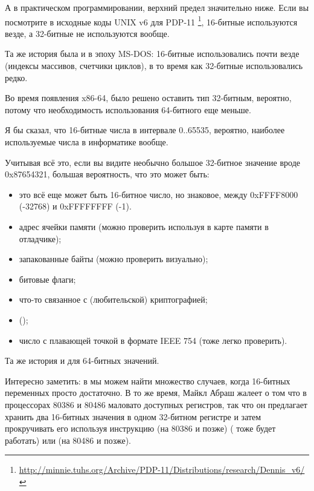 А в практическом программировании, верхний предел значительно ниже.
Если вы посмотрите в исходные коды UNIX v6 для PDP-11
\footnote{\url{http://minnie.tuhs.org/Archive/PDP-11/Distributions/research/Dennis_v6/}},
16-битные  используются везде, а 32-битные  не используются вообще.

Та же история была и в эпоху MS-DOS: 16-битные  использовались почти везде (индексы массивов, счетчики циклов),
в то время как 32-битные  использовались редко.

Во время появления x86-64, было решено оставить тип  32-битным, вероятно, потому что 
необходимость использования 64-битного  еще меньше.

Я бы сказал, что 16-битные числа в интервале 0..65535, вероятно, наиболее используемые числа в информатике вообще.

Учитывая всё это, если вы видите необычно большое 32-битное значение вроде 0x87654321, большая вероятность,
что это может быть:

\begin{itemize}

\item это всё еще может быть 16-битное число, но знаковое, между 0xFFFF8000 (-32768) и 0xFFFFFFFF (-1).
\item адрес ячейки памяти (можно проверить используя в карте памяти в отладчике);
\item запакованные байты (можно проверить визуально);
\item битовые флаги;
\item что-то связанное с (любительской) криптографией;
\item {} ();
\item число с плавающей точкой в формате IEEE 754 (тоже легко проверить).

\end{itemize}

Та же история и для 64-битных значений.


Интересно заметить: в 
мы можем найти множество случаев, когда 16-битных переменных просто достаточно.
В то же время, Майкл Абраш жалеет о том что в процессорах 80386 и 80486 маловато доступных регистров,
так что он предлагает хранить два 16-битных значения в одном 32-битном регистре и затем прокручивать его 
используя инструкцию  (на 80386 и позже) ( тоже будет работать) или
 (на 80486 и позже).

